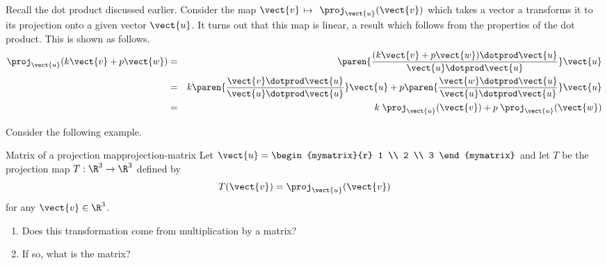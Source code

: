 Recall the dot product discussed earlier. Consider the map $\vect{v}$\textbf{$\mapsto $}
$\proj_{\vect{u}}(\vect{v}) $ which takes a vector a transforms it to its projection onto a given vector $\vect{u}$. It turns out that
this map is linear, a result which follows from the properties of the
dot product. This is shown as follows.
\begin{eqnarray*}
\proj_{\vect{u}}(k \vect{v}+ p \vect{w})
&=&\paren{\vspace{0.05in}\frac{(k \vect{v}+ p \vect{w})\dotprod \vect{u}}{
\vect{u}\dotprod \vect{u}}} \vect{u} \\
&=& k  \paren{\vspace{0.05in}\frac{
\vect{v}\dotprod \vect{u}}{\vect{u}\dotprod \vect{u}}} \vect{u}+p \paren{\vspace{
0.05in}\frac{\vect{w}\dotprod \vect{u}}{\vect{u}\dotprod \vect{u}}} \vect{u} \\
&=& k \; \proj_{\vect{u}}(\vect{v}) +p \; \proj
_{\vect{u}}(\vect{w})
\end{eqnarray*}

Consider the following example.

\begin{example}{Matrix of a projection map}{projection-matrix}
Let $\vect{u} = \begin{mymatrix}{r}
1 \\
2 \\
3
\end{mymatrix}$ and let $T$ be the projection map $T: \R^3 \to \R^3$ defined by
\[
T(\vect{v}) = \proj_{\vect{u}}(\vect{v})
\]
for any $\vect{v} \in \R^3$.
\begin{enumerate}
\item Does this transformation come from
multiplication by a matrix?
\item If so, what is the matrix?
\end{enumerate}
\end{example}


